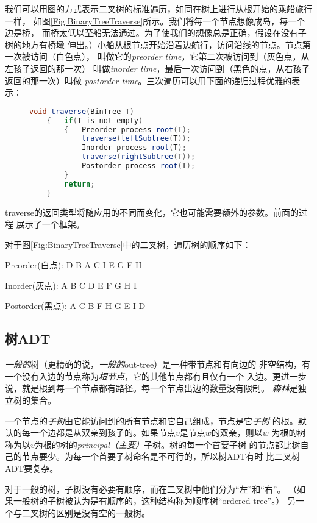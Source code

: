 我们可以用图的方式表示二叉树的标准遍历，如同在树上进行从根开始的乘船旅行一样，
如图\ref{Fig:BinaryTreeTraverse}所示。我们将每一个节点想像成岛，每一个边是桥，
而桥太低以至船无法通过。为了使我们的想像总是正确，假设在没有子树的地方有桥墩
伸出。）小船从根节点开始沿着边航行，访问沿线的节点。节点第一次被访问（白色点），
叫做它的\emph{preorder time}，它第二次被访问到（灰色点，从左孩子返回的那一次）
叫做\emph{inorder time}，最后一次访问到（黑色的点，从右孩子返回的那一次）叫做
\emph{postorder time}。三次遍历可以用下面的递归过程优雅的表示：

\begin{figure}
\begin{lstlisting}[language={Java}, keywordstyle=\color{blue!70}, commentstyle=\color{red!50!green!50!blue!50}]
    void traverse(BinTree T)
    {   if(T is not empty)
        {   Preorder-process root(T);
            traverse(leftSubtree(T));
            Inorder-process root(T);
            traverse(rightSubtree(T));
            Postorder-process root(T);
        }
        return;
    }
\end{lstlisting}
\end{figure}
traverse的返回类型将随应用的不同而变化，它也可能需要额外的参数。前面的过程
展示了一个框架。

对于图\ref{Fig:BinaryTreeTraverse}中的二叉树，遍历树的顺序如下：

    Preorder(白点):  D B A C I E G F H

    Inorder(灰点):   A B C D E F G H I

    Postorder(黑点): A C B F H G E I D



\subsection{树ADT}\label{Sec:TreeADT}
\emph{一般的}树（更精确的说，\emph{一般的}out-tree）是一种带节点和有向边的
非空结构，有一个没有入边的节点称为\emph{根节点}，它的其他节点都有且仅有一个
入边。更进一步说，就是根到每一个节点都有路径。每一个节点出边的数量没有限制。
\emph{森林}是独立树的集合。

一个节点的\emph{子树}由它能访问到的所有节点和它自己组成，节点是它\emph{子树}
的根。默认的每一个边都是从双亲到孩子的。如果节点$v$是节点$w$的双亲，则以$w$
为根的树称为以$v$为根的树的\emph{principal（主要）}子树。树的每一个首要子树
的节点都比树自己的节点要少。为每一个首要子树命名是不可行的，所以树ADT有时
比二叉树ADT要复杂。

对于一般的树，子树没有必要有顺序，而在二叉树中他们分为“左”和“右”。
（如果一般树的子树被认为是有顺序的，这种结构称为顺序树“ordered tree”。）
另一个与二叉树的区别是没有空的一般树。

